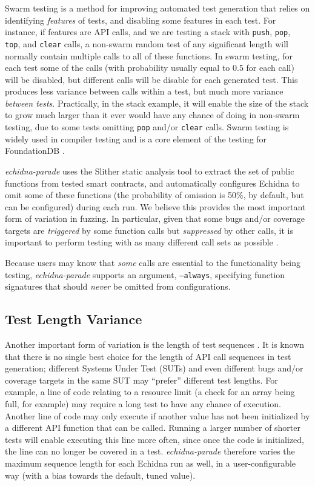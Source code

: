 \documentclass[sigconf]{acmart}
\begin{document}
{Swarm testing \cite{ISSTA12} is a method for improving automated test
generation that relies on identifying \emph{features} of tests, and
disabling some features in each test.  For instance, if features are
API calls, and we are testing a stack with {\tt push}, {\tt pop}, {\tt
  top}, and {\tt clear} calls, a non-swarm random test of any
significant length will normally contain multiple calls to all of
these functions.  In swarm testing, for each test some of the calls
(with probability usually equal to 0.5 for each call) will be
disabled, but different calls will be disable for each generated
test.  This produces less variance between calls within a test, but
much more variance \emph{between tests}.  Practically, in the stack
example, it will enable the size of the stack to grow much larger than
it ever would have any chance of doing in non-swarm testing, due to
some tests omitting {\tt pop} and/or {\tt clear} calls.  Swarm testing
is widely used in compiler testing
\cite{le2014compiler} and is a core element of the
testing for FoundationDB \cite{zhou2021foundationdb}.

\emph{echidna-parade} uses the Slither static analysis tool to extract
the set of public functions from tested smart contracts, and
automatically configures Echidna to omit some of these functions
(the probability of omission is 50\%, by default, but can be configured)
during each run.  We believe this provides the most important form of variation
in fuzzing.  In particular, given that some bugs and/or coverage
targets are \emph{triggered} by some function calls but
\emph{suppressed} by other calls, it is important to perform testing
with as many different call sets as possible \cite{groce2013help}.

Because users may know that \emph{some} calls are essential to the functionality being testing, \emph{echidna-parade} supports an argument, {\tt --always}, specifying function signatures that should \emph{never} be omitted from configurations.

\subsection{Test Length Variance}

Another important form of variation is the length of test sequences \cite{ASE08,ArcuriLen}.  It is
known that there is no single best choice for the length of API call
sequences in test generation; different Systems Under Test  (SUTs) and even different bugs
and/or coverage targets in the same SUT may ``prefer'' different test
lengths.  For example, a line of code relating to a resource limit (a
check for an array being full, for example) may require a long test to
have any chance of execution.  Another line of code may only execute
if another value has not been initialized by a different API function
that can be called.  Running a larger number of shorter tests will enable executing
this line more often, since once the code is initialized, the line can
no longer be covered in a test.  \emph{echidna-parade} therefore
varies the maximum sequence length for each Echidna run as well, in a
user-configurable way (with a bias towards the default, tuned value).

}
\end{document}
